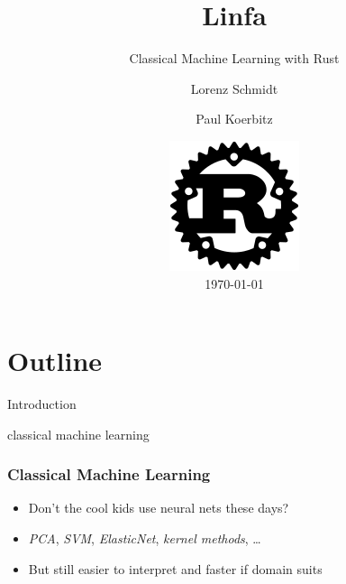 \documentclass[xcolor=x11names,compress]{beamer}
\author{Lorenz Schmidt \inst{1} \and Paul Koerbitz \inst{2}}
\institute{\it \inst{1} RWTH Aachen \and \inst{2} Google}
\begin{document}
\section{Outline}
\begin{frame}
    \title{Linfa}
    \subtitle{Classical Machine Learning with Rust}
    \date{
        \includegraphics[scale=0.5]{images/rust.png} \\
        \vspace{0.5cm}
        \today
    }
	\titlepage
\end{frame}

\begin{frame}{Introduction}
	\tableofcontents
\end{frame}

\begin{frame}{classical machine learning}
    \frametitle{Classical Machine Learning}

    \begin{itemize}
        \item<1-> Don't the cool kids use neural nets these days?
        \item<3-> \textit{PCA}, \textit{SVM}, \textit{ElasticNet}, \textit{kernel methods}, \dots
        \item<4-> But still easier to interpret and faster if domain suits
    \end{itemize}

\end{frame}
\end{document}
